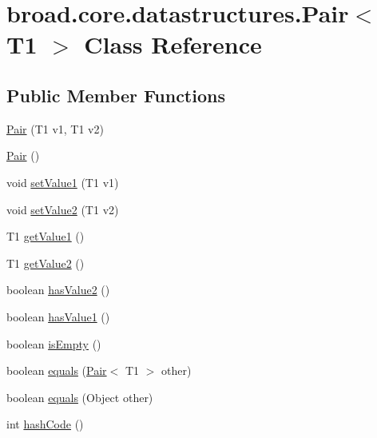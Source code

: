 \hypertarget{classbroad_1_1core_1_1datastructures_1_1_pair_3_01_t1_01_4}{\section{broad.\+core.\+datastructures.\+Pair$<$ T1 $>$ Class Reference}
\label{classbroad_1_1core_1_1datastructures_1_1_pair_3_01_t1_01_4}
}
\subsection*{Public Member Functions}
\begin{DoxyCompactItemize}
\item 
\hyperlink{classbroad_1_1core_1_1datastructures_1_1_pair_3_01_t1_01_4_aa6bff2f2b5c8cccd0798e0ffc0b0b2f6}{Pair} (T1 v1, T1 v2)
\item 
\hyperlink{classbroad_1_1core_1_1datastructures_1_1_pair_3_01_t1_01_4_a61e3c39d2d6dc1c6601454e1ba8a4077}{Pair} ()
\item 
void \hyperlink{classbroad_1_1core_1_1datastructures_1_1_pair_3_01_t1_01_4_a6fd405224a4032e432aa5880d8d43d54}{set\+Value1} (T1 v1)
\item 
void \hyperlink{classbroad_1_1core_1_1datastructures_1_1_pair_3_01_t1_01_4_a249331b264af2be64ae4d0fb4046839c}{set\+Value2} (T1 v2)
\item 
T1 \hyperlink{classbroad_1_1core_1_1datastructures_1_1_pair_3_01_t1_01_4_a8c03da02a99a2c76396fda801ceac218}{get\+Value1} ()
\item 
T1 \hyperlink{classbroad_1_1core_1_1datastructures_1_1_pair_3_01_t1_01_4_a4c03600e24ad8920674cb2edf989400e}{get\+Value2} ()
\item 
boolean \hyperlink{classbroad_1_1core_1_1datastructures_1_1_pair_3_01_t1_01_4_a55a7f64bb349418d5079bece9ef96c22}{has\+Value2} ()
\item 
boolean \hyperlink{classbroad_1_1core_1_1datastructures_1_1_pair_3_01_t1_01_4_a9ca1bac4de2ea0367a8e54fa725f0530}{has\+Value1} ()
\item 
boolean \hyperlink{classbroad_1_1core_1_1datastructures_1_1_pair_3_01_t1_01_4_a7dced7e2243229ef6b4b58ae7920b248}{is\+Empty} ()
\item 
boolean \hyperlink{classbroad_1_1core_1_1datastructures_1_1_pair_3_01_t1_01_4_adf87d062f728e83c7977320df8476d1b}{equals} (\hyperlink{classbroad_1_1core_1_1datastructures_1_1_pair_3_01_t1_01_4_aa6bff2f2b5c8cccd0798e0ffc0b0b2f6}{Pair}$<$ T1 $>$ other)
\item 
boolean \hyperlink{classbroad_1_1core_1_1datastructures_1_1_pair_3_01_t1_01_4_a08cc6d7008bcedcad0a57af33465b12b}{equals} (Object other)
\item 
int \hyperlink{classbroad_1_1core_1_1datastructures_1_1_pair_3_01_t1_01_4_a10154a655ecc4e9b30f25245da8a3ee3}{hash\+Code} ()
\end{DoxyCompactItemize}


